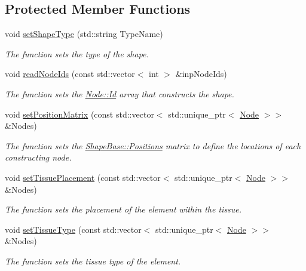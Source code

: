 \subsection*{Protected Member Functions}
\begin{DoxyCompactItemize}
\item 
void \hyperlink{classShapeBase_a4cc6c721ed24f27baa71fe9398edd87a}{set\+Shape\+Type} (std\+::string Type\+Name)
\begin{DoxyCompactList}\small\item\em The function sets the type of the shape. \end{DoxyCompactList}\item 
void \hyperlink{classShapeBase_a96dae3d137adec217bb0bc6ed2cace97}{read\+Node\+Ids} (const std\+::vector$<$ int $>$ \&inp\+Node\+Ids)
\begin{DoxyCompactList}\small\item\em The function sets the \hyperlink{classNode_a1bd379569cc1a8b96432e61971aed4d9}{Node\+::\+Id} array that constructs the shape. \end{DoxyCompactList}\item 
void \hyperlink{classShapeBase_a474774dd9db4c42990de569b3d8cd52e}{set\+Position\+Matrix} (const std\+::vector$<$ std\+::unique\+\_\+ptr$<$ \hyperlink{classNode}{Node} $>$$>$ \&Nodes)
\begin{DoxyCompactList}\small\item\em The function sets the \hyperlink{classShapeBase_a6a6bd8c65e2a0bfea3a956604bc05cb9}{Shape\+Base\+::\+Positions} matrix to define the locations of each constructing node. \end{DoxyCompactList}\item 
void \hyperlink{classShapeBase_a3777927e49e4b09bfb524b4f4ac889ad}{set\+Tissue\+Placement} (const std\+::vector$<$ std\+::unique\+\_\+ptr$<$ \hyperlink{classNode}{Node} $>$$>$ \&Nodes)
\begin{DoxyCompactList}\small\item\em The function sets the placement of the element within the tissue. \end{DoxyCompactList}\item 
void \hyperlink{classShapeBase_ad5f0b9431be849133a4eab5484fbb1f8}{set\+Tissue\+Type} (const std\+::vector$<$ std\+::unique\+\_\+ptr$<$ \hyperlink{classNode}{Node} $>$$>$ \&Nodes)
\begin{DoxyCompactList}\small\item\em The function sets the tissue type of the element. \end{DoxyCompactList}\item 
$$
\end{DoxyCompactItemize}
